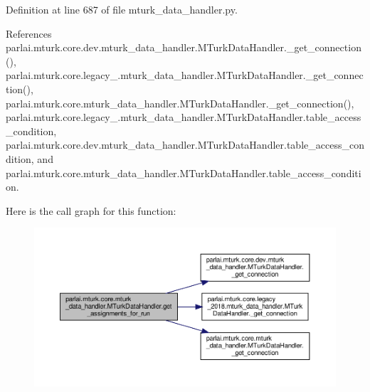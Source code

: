 Definition at line 687 of file mturk\+\_\+data\+\_\+handler.\+py.



References parlai.\+mturk.\+core.\+dev.\+mturk\+\_\+data\+\_\+handler.\+M\+Turk\+Data\+Handler.\+\_\+get\+\_\+connection(), parlai.\+mturk.\+core.\+legacy\+\_.\+mturk\+\_\+data\+\_\+handler.\+M\+Turk\+Data\+Handler.\+\_\+get\+\_\+connection(), parlai.\+mturk.\+core.\+mturk\+\_\+data\+\_\+handler.\+M\+Turk\+Data\+Handler.\+\_\+get\+\_\+connection(), parlai.\+mturk.\+core.\+legacy\+\_.\+mturk\+\_\+data\+\_\+handler.\+M\+Turk\+Data\+Handler.\+table\+\_\+access\+\_\+condition, parlai.\+mturk.\+core.\+dev.\+mturk\+\_\+data\+\_\+handler.\+M\+Turk\+Data\+Handler.\+table\+\_\+access\+\_\+condition, and parlai.\+mturk.\+core.\+mturk\+\_\+data\+\_\+handler.\+M\+Turk\+Data\+Handler.\+table\+\_\+access\+\_\+condition.

Here is the call graph for this function\+:
\nopagebreak
\begin{figure}[H]
\begin{center}
\leavevmode
\includegraphics[width=350pt]{classparlai_1_1mturk_1_1core_1_1mturk__data__handler_1_1MTurkDataHandler_ad08412db3d132299e287f182fef8b6dc_cgraph}
\end{center}
\end{figure}
\mbox{\label{classparlai_1_1mturk_1_1core_1_1mturk__data__handler_1_1MTurkDataHandler_a0a245b58629056030d5eedfce5c5a985}} 
